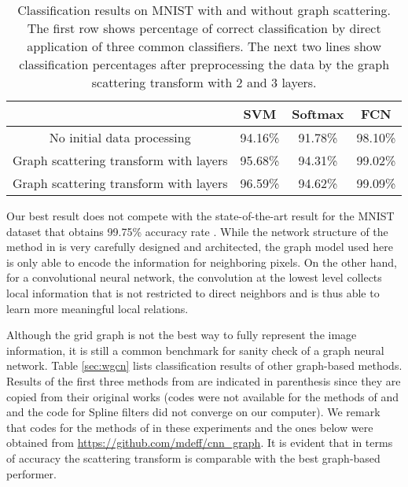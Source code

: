 \documentclass{article}
\begin{document}
\begin{table}[!ht]
\centering
\begin{tabular}{|c|c|c|c|}
\hline
~ & SVM & Softmax & FCN \\
\hline
No initial data processing  & 94.16\% & 91.78\% & 98.10\% \\
\hline
Graph scattering transform with  layers & 95.68\% & 94.31\% & {99.02}\% \\
\hline
Graph scattering transform with  layers & 96.59\% & 94.62\% & {99.09}\%\\
\hline
\end{tabular}
\caption{Classification results on MNIST with and without graph scattering. The first row shows percentage of correct classification by direct application of three common classifiers. The next two lines show classification percentages after preprocessing the data by the graph scattering transform with 2 and 3 layers. }
\label{tab:mnist}
\end{table}

Our best result does not compete with the state-of-the-art result for the MNIST dataset {that obtains 99.75\% accuracy rate \cite{SabFH17}.}
{While the network structure of the method in \cite{SabFH17} is very carefully designed and architected, the graph model used here is only able to encode the information for neighboring pixels. On the other hand, for a convolutional neural network, the convolution at the lowest level collects local information that is not restricted to direct neighbors and is thus able to learn more meaningful local relations.}


{Although the grid graph is not the best way to fully represent the image information, it is still a common benchmark for sanity check of a graph neural network.} Table \ref{sec:wgcn} lists classification results of other graph-based methods. {Results of the first three methods from \cite{EdwX16, HecCQ17, DefBV16} are indicated in parenthesis since they are copied from their original works (codes were not available for the methods of \cite{EdwX16} and \cite{HecCQ17} and the code for Spline filters \cite{DefBV16} did not converge on our computer).
We remark that codes for the methods of \cite{DefBV16} in these experiments and the ones below were obtained from \url{https://github.com/mdeff/cnn\_graph}. }
It is evident that {in terms of accuracy} the scattering transform is comparable with the best graph-based performer.
\end{document}
